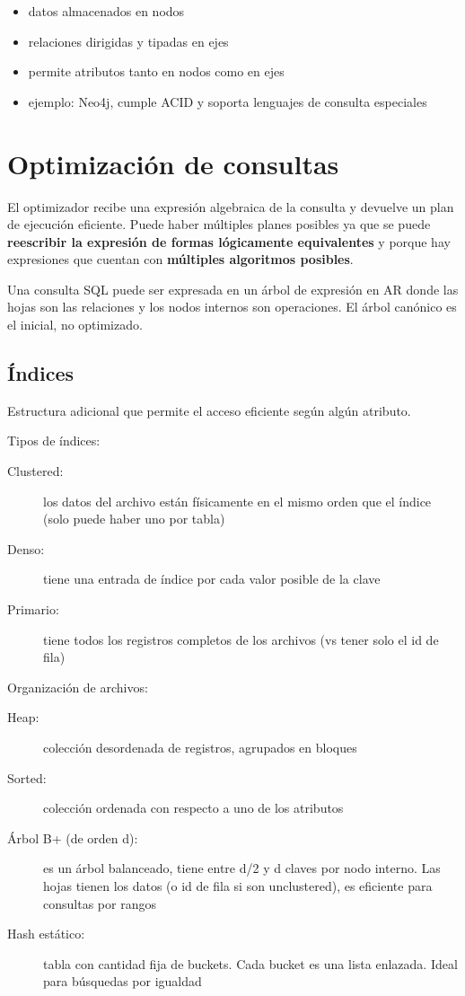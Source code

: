 \begin{itemize}
	\item datos almacenados en nodos
	\item relaciones dirigidas y tipadas en ejes
	\item permite atributos tanto en nodos como en ejes
	\item ejemplo: Neo4j, cumple ACID y soporta lenguajes de consulta especiales
\end{itemize}

\section{Optimización de consultas}

El optimizador recibe una expresión algebraica de la consulta y devuelve un plan de ejecución eficiente.
Puede haber múltiples planes posibles ya que se puede \textbf{reescribir la expresión de formas lógicamente equivalentes} y porque hay expresiones que cuentan con \textbf{múltiples algoritmos posibles}.

Una consulta SQL puede ser expresada en un árbol de expresión en AR donde las hojas son las relaciones y los nodos internos son operaciones.
El árbol canónico es el inicial, no optimizado.

\subsection{Índices}

Estructura adicional que permite el acceso eficiente según algún atributo.

Tipos de índices:

\begin{description}
	\item[Clustered:] los datos del archivo están físicamente en el mismo orden que el índice (solo puede haber uno por tabla)
	\item[Denso:] tiene una entrada de índice por cada valor posible de la clave
	\item[Primario:] tiene todos los registros completos de los archivos (vs tener solo el id de fila)
\end{description}

Organización de archivos:

\begin{description}
	\item[Heap:] colección desordenada de registros, agrupados en bloques
	\item[Sorted:] colección ordenada con respecto a uno de los atributos
	\item[Árbol B+ (de orden d):] es un árbol balanceado, tiene entre d/2 y d claves por nodo interno. Las hojas tienen los datos (o id de fila si son unclustered), es eficiente para consultas por rangos
	\item[Hash estático:] tabla con cantidad fija de buckets. Cada bucket es una lista enlazada. Ideal para búsquedas por igualdad
\end{description}


